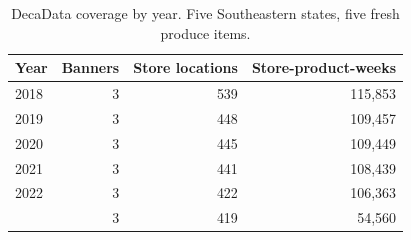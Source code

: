 \begin{table}[!h]
\centering
\caption{\label{tab:decadata_summary}DecaData coverage by year. Five Southeastern states, five fresh produce items.}
\centering
\begin{tabular}[t]{lrrr}
\toprule
Year & Banners & Store locations & Store-product-weeks\\
\midrule
2018 & 3 & 539 & 115,853\\
2019 & 3 & 448 & 109,457\\
2020 & 3 & 445 & 109,449\\
2021 & 3 & 441 & 108,439\\
2022 & 3 & 422 & 106,363\\
\addlinespace
2023 & 3 & 419 & 54,560\\
\bottomrule
\end{tabular}
\end{table}

